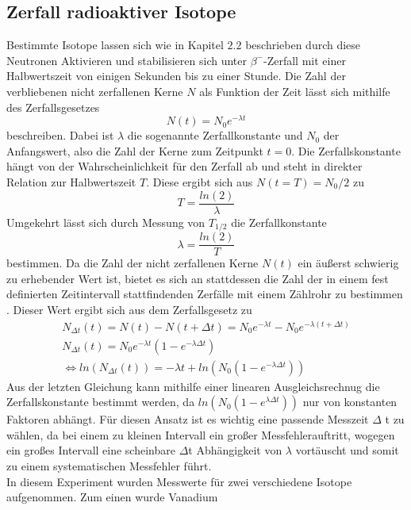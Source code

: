 \subsection{Zerfall radioaktiver Isotope}
Bestimmte Isotope lassen sich wie in Kapitel $2.2$ beschrieben durch diese Neutronen Aktivieren und 
stabilisieren sich unter $\beta^-$-Zerfall mit einer Halbwertszeit von einigen Sekunden bis zu einer 
Stunde. Die Zahl der verbliebenen nicht zerfallenen Kerne $N$ als Funktion der Zeit lässt sich mithilfe 
des Zerfallsgesetzes
\begin{equation}
    \label{eq:gesetz}
N(t)=N_0e^{-\lambda t}
\end{equation}
beschreiben. Dabei ist $\lambda$ die sogenannte Zerfallkonstante und $N_0$ der Anfangswert, also die Zahl 
der Kerne zum Zeitpunkt $t=0$. Die Zerfallskonstante hängt von der Wahrscheinlichkeit für den Zerfall ab 
und steht in direkter Relation zur Halbwertszeit $T$. Diese ergibt sich aus $N(t=T)=N_0/2$ zu
\begin{equation}
T=\frac{ln(2)}{\lambda}
\end{equation}
Umgekehrt lässt sich durch Messung von $T_{1/2}$ die Zerfallkonstante
\begin{equation*}
\lambda=\frac{ln(2)}{T}
\end{equation*}
bestimmen. Da die Zahl der nicht zerfallenen Kerne $N(t)$ ein äußerst schwierig zu erhebender Wert ist, 
bietet es sich an  stattdessen die Zahl der in einem fest definierten Zeitintervall stattfindenden Zerfälle 
mit einem Zählrohr zu bestimmen . Dieser Wert ergibt sich aus dem Zerfallsgesetz zu
\begin{gather}
N_{\Delta t}(t)=N(t)-N(t + \Delta t)=N_0e^{-\lambda t}-N_0e^{-\lambda (t+\Delta t)} \\
\label{eq:zerfallsgesetz}
N_{\Delta t}(t)=N_0e^{-\lambda t}(1-e^{-\lambda \Delta t} ) \\
\iff ln(N_{\Delta t}(t))=-\lambda t + ln(N_0(1-e^{-\lambda \Delta t}))
\end{gather}
Aus der letzten Gleichung kann mithilfe einer linearen Ausgleichsrechnug die Zerfallskonstante bestimmt 
werden, da $ln(N_0(1-e^{\lambda \Delta t}))$ nur von konstanten Faktoren abhängt. Für diesen Ansatz ist 
es wichtig eine passende Messzeit $\Delta$ t zu wählen, da bei einem zu kleinen Intervall ein großer 
Messfehlerauftritt, wogegen ein großes Intervall eine scheinbare $\Delta$t Abhängigkeit von $\lambda$ 
vortäuscht und somit zu einem systematischen Messfehler führt. \\
In diesem Experiment wurden Messwerte für zwei verschiedene Isotope aufgenommen. Zum einen wurde Vanadium 
